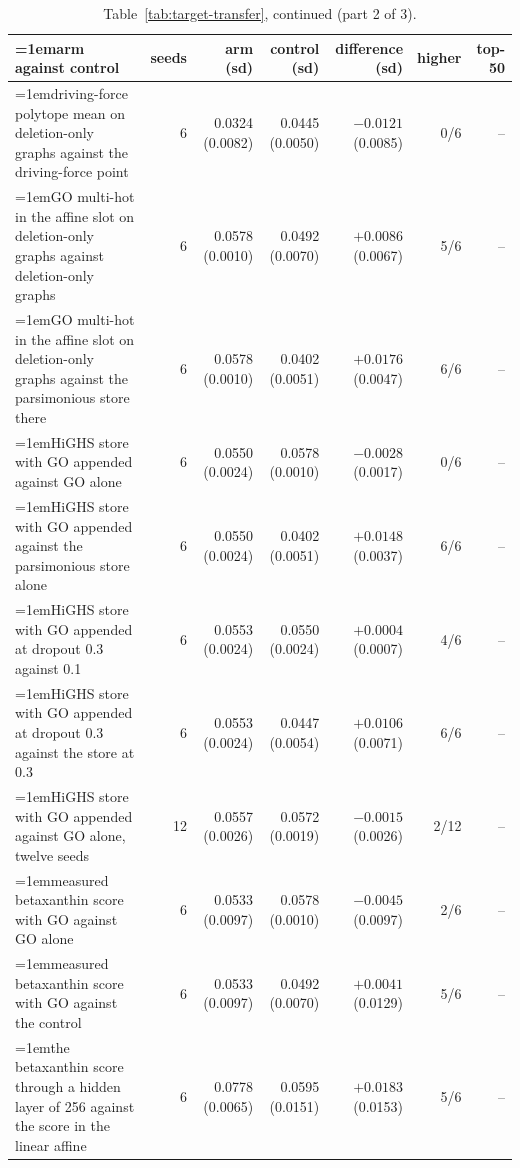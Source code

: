 \begin{table}[H]
  \centering
  \footnotesize
  \setlength{\tabcolsep}{2.5pt}
  \caption[The rounds on amino acids: arm against control, continued]{Table~\ref{tab:target-transfer}, continued (part 2 of 3).}
  \label{tab:target-transfer-2}
  \begin{tabular}{@{}>{\raggedright\hangindent=1em\hangafter=1\arraybackslash}p{84.3mm}rrrrrr@{}}
    \hline
    arm against control & seeds & arm (sd) & control (sd) & difference (sd) & higher & top-50 \\
    \hline
    driving-force polytope mean on deletion-only graphs against the driving-force point & 6 & 0.0324 (0.0082) & 0.0445 (0.0050) & $-0.0121$ (0.0085) & 0/6 & -- \\
    GO multi-hot in the affine slot on deletion-only graphs against deletion-only graphs & 6 & 0.0578 (0.0010) & 0.0492 (0.0070) & $+0.0086$ (0.0067) & 5/6 & -- \\
    GO multi-hot in the affine slot on deletion-only graphs against the parsimonious store there & 6 & 0.0578 (0.0010) & 0.0402 (0.0051) & $+0.0176$ (0.0047) & 6/6 & -- \\
    HiGHS store with GO appended against GO alone & 6 & 0.0550 (0.0024) & 0.0578 (0.0010) & $-0.0028$ (0.0017) & 0/6 & -- \\
    HiGHS store with GO appended against the parsimonious store alone & 6 & 0.0550 (0.0024) & 0.0402 (0.0051) & $+0.0148$ (0.0037) & 6/6 & -- \\
    HiGHS store with GO appended at dropout 0.3 against 0.1 & 6 & 0.0553 (0.0024) & 0.0550 (0.0024) & $+0.0004$ (0.0007) & 4/6 & -- \\
    HiGHS store with GO appended at dropout 0.3 against the store at 0.3 & 6 & 0.0553 (0.0024) & 0.0447 (0.0054) & $+0.0106$ (0.0071) & 6/6 & -- \\
    HiGHS store with GO appended against GO alone, twelve seeds & 12 & 0.0557 (0.0026) & 0.0572 (0.0019) & $-0.0015$ (0.0026) & 2/12 & -- \\
    measured betaxanthin score with GO against GO alone & 6 & 0.0533 (0.0097) & 0.0578 (0.0010) & $-0.0045$ (0.0097) & 2/6 & -- \\
    measured betaxanthin score with GO against the control & 6 & 0.0533 (0.0097) & 0.0492 (0.0070) & $+0.0041$ (0.0129) & 5/6 & -- \\
    the betaxanthin score through a hidden layer of 256 against the score in the linear affine & 6 & 0.0778 (0.0065) & 0.0595 (0.0151) & $+0.0183$ (0.0153) & 5/6 & -- \\

\end{tabular}
\end{table}
